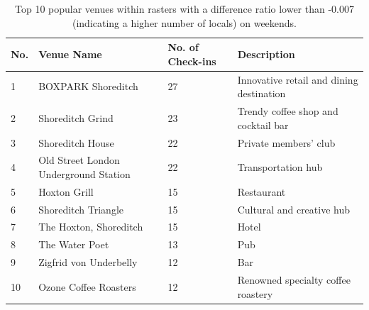 \documentclass{article}
\theoremstyle{remark}
\begin{document}
\begin{table}[!h]
\centering
\caption{\label{tab:popular_venues_localspop_weekend}Top 10 popular venues within rasters with a difference ratio lower than -0.007 (indicating a higher number of locals) on weekends.}
\begin{adjustbox}{max width=\textwidth, margin=0cm}
\begin{threeparttable}
\begin{tabular}{lp{5cm}lp{4cm}} \hline
No. & Venue Name & No. of Check-ins & Description \\ \hline
1 & BOXPARK Shoreditch & 27 & Innovative retail and dining destination \\
2 & Shoreditch Grind & 23 & Trendy coffee shop and cocktail bar \\
3 & Shoreditch House & 22 & Private members' club \\
4 & Old Street London Underground Station & 22 & Transportation hub \\
5 & Hoxton Grill & 15 & Restaurant \\
6 & Shoreditch Triangle & 15 & Cultural and creative hub \\
7 & The Hoxton, Shoreditch & 15 & Hotel \\
8 & The Water Poet & 13 & Pub \\
9 & Zigfrid von Underbelly & 12 & Bar \\
10 & Ozone Coffee Roasters & 12 & Renowned specialty coffee roastery \\ \hline
\end{tabular}
\end{threeparttable}
\end{adjustbox}
\end{table}
\end{document}
